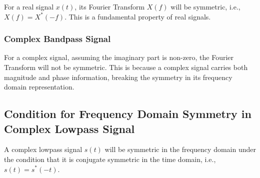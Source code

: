 \documentclass{article}
\begin{document}
For a real signal $x(t)$, its Fourier Transform $X(f)$ will be symmetric, i.e., $X(f) = X^*(-f)$. This is a fundamental property of real signals.

\subsubsection*{Complex Bandpass Signal}

For a complex signal, assuming the imaginary part is non-zero, the Fourier Transform will not be symmetric. This is because a complex signal carries both magnitude and phase information, breaking the symmetry in its frequency domain representation.

\subsection*{Condition for Frequency Domain Symmetry in Complex Lowpass Signal}

A complex lowpass signal $s(t)$ will be symmetric in the frequency domain under the condition that it is conjugate symmetric in the time domain, i.e., $s(t) = s^*(-t)$.
\end{document}
